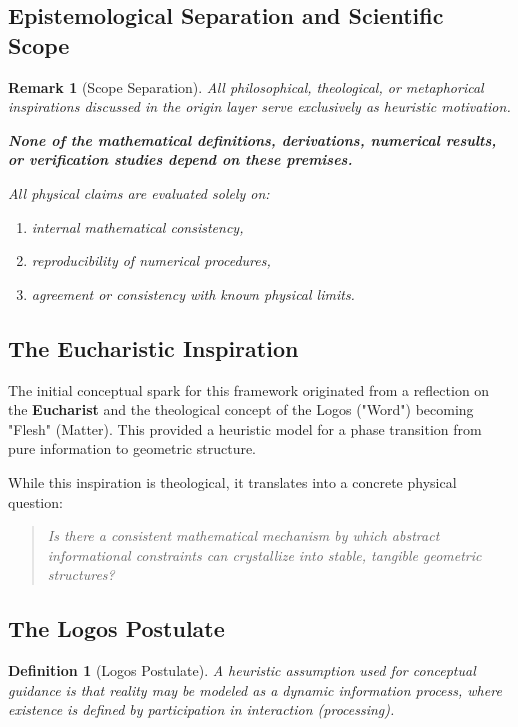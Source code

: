 \documentclass[11pt,a4paper]{article}
\newtheorem{definition}{Definition}
\newtheorem{remark}{Remark}
\begin{document}
\subsection{Epistemological Separation and Scientific Scope}
\begin{remark}[Scope Separation]
All philosophical, theological, or metaphorical inspirations discussed in the origin layer serve exclusively as heuristic motivation.

\textbf{None of the mathematical definitions, derivations, numerical results, or verification studies depend on these premises.}

All physical claims are evaluated solely on:
\begin{enumerate}[leftmargin=1.4em]
    \item internal mathematical consistency,
    \item reproducibility of numerical procedures,
    \item agreement or consistency with known physical limits.
\end{enumerate}
\end{remark}

\subsection{The Eucharistic Inspiration}
The initial conceptual spark for this framework originated from a reflection on the \textbf{Eucharist} and the theological concept of the Logos ("Word") becoming "Flesh" (Matter). This provided a heuristic model for a phase transition from pure information to geometric structure.

While this inspiration is theological, it translates into a concrete physical question:
\begin{quote}
\textit{Is there a consistent mathematical mechanism by which abstract informational constraints can crystallize into stable, tangible geometric structures?}
\end{quote}

\subsection{The Logos Postulate}
\begin{definition}[Logos Postulate]
A heuristic assumption used for conceptual guidance is that reality may be modeled as a dynamic information process, where existence is defined by participation in interaction (processing).
\end{definition}
\end{document}
